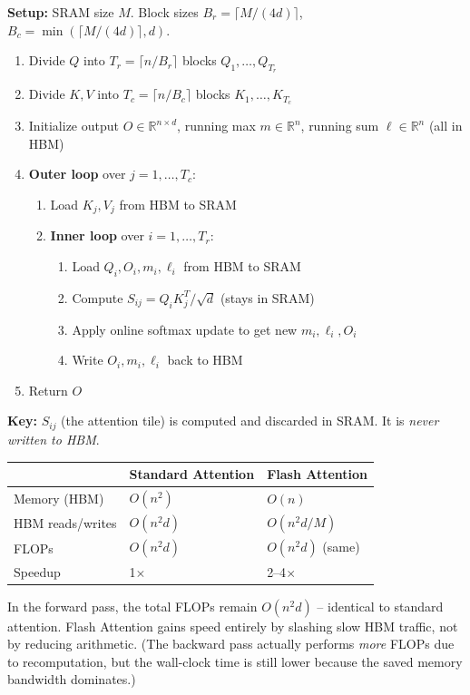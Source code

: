 \begin{examplebox}
\textbf{Setup:} SRAM size $M$. Block sizes $B_r = \lceil M / (4d) \rceil$, $B_c = \min(\lceil M / (4d) \rceil, d)$.

\begin{enumerate}
  \item Divide $Q$ into $T_r = \lceil n / B_r \rceil$ blocks $Q_1, \ldots, Q_{T_r}$
  \item Divide $K, V$ into $T_c = \lceil n / B_c \rceil$ blocks $K_1, \ldots, K_{T_c}$
  \item Initialize output $O \in \mathbb{R}^{n \times d}$, running max $m \in \mathbb{R}^n$, running sum $\ell \in \mathbb{R}^n$ (all in HBM)
  \item \textbf{Outer loop} over $j = 1, \ldots, T_c$:

\begin{enumerate}
  \item Load $K_j, V_j$ from HBM to SRAM
  \item \textbf{Inner loop} over $i = 1, \ldots, T_r$:

\begin{enumerate}
  \item Load $Q_i, O_i, m_i, \ell_i$ from HBM to SRAM
  \item Compute $S_{ij} = Q_i K_j^T / \sqrt{d}$ (stays in SRAM)
  \item Apply online softmax update to get new $m_i, \ell_i, O_i$
  \item Write $O_i, m_i, \ell_i$ back to HBM
\end{enumerate}
\end{enumerate}
  \item Return $O$
\end{enumerate}

\textbf{Key:} $S_{ij}$ (the attention tile) is computed and discarded in SRAM. It is \emph{never written to HBM}.
\end{examplebox}

\begin{keybox}
\begin{tabular}{@{}lp{5cm}p{6.5cm}@{}}
\toprule
 & \textbf{Standard Attention} & \textbf{Flash Attention} \\
\midrule
Memory (HBM) & $O(n^2)$ & $O(n)$ \\
HBM reads/writes & $O(n^2 d)$ & $O(n^2 d / M)$ \\
FLOPs & $O(n^2 d)$ & $O(n^2 d)$ (same) \\
Speedup & 1$\times$ & 2--4$\times$ \\
\bottomrule
\end{tabular}

In the forward pass, the total FLOPs remain $O(n^2 d)$ -- identical to standard attention. Flash Attention gains speed entirely by slashing slow HBM traffic, not by reducing arithmetic. (The backward pass actually performs \emph{more} FLOPs due to recomputation, but the wall-clock time is still lower because the saved memory bandwidth dominates.)
\end{keybox}

